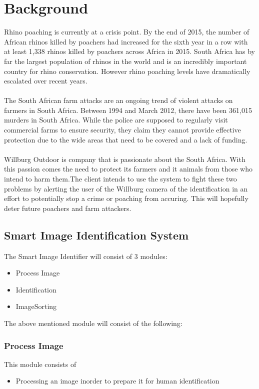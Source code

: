 \documentclass[a4paper,12pt]{report}
\begin{document}
\renewcommand{\thesection}{\arabic{section}}
\newpage

\section {Background}
Rhino poaching is currently at a crisis point. By the end of 2015, the number of African rhinos killed by poachers had increased for the sixth year in a row with at least 1,338 rhinos killed by poachers across Africa in 2015. South Africa has by far the largest population of rhinos in the world and is an incredibly important country for rhino conservation. However rhino poaching levels have dramatically escalated over recent years. \\
\\The South African farm attacks are an ongoing trend of violent attacks on farmers in South Africa. Between 1994 and March 2012, there have been 361,015 murders in South Africa. While the police are supposed to regularly visit commercial farms to ensure security, they claim they cannot provide effective protection due to the wide areas that need to be covered and a lack of funding.\\
\\Willburg Outdoor is company that is passionate about the South Africa. With this passion comes the need to protect its farmers and it animals from those who intend to harm them.The client intends to use the system to fight these two problems by alerting the user of the Willburg camera of the identification in an effort to potentially stop a crime or poaching from accuring. This will hopefully deter future poachers and farm attackers.

\subsection {Smart Image Identification System}
The Smart Image Identifier will consist of 3 modules:
	\begin {itemize}
		\item Process Image
		\item Identification
		\item ImageSorting
	\end {itemize}

The above mentioned module will consist of the following:
	\subsubsection {Process Image}
		This module consists of 
			\begin {itemize}
				\item Processing an image inorder to prepare it for human identification
			\end {itemize}
\end{document}
